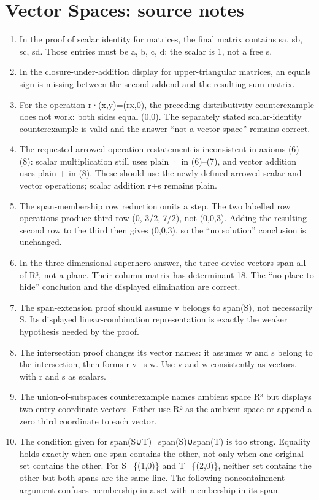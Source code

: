 \section*{Vector Spaces: source notes}
\begin{enumerate}
\item In the proof of scalar identity for matrices, the final matrix contains sa, sb, sc, sd. Those entries must be a, b, c, d: the scalar is 1, not a free s.
\item In the closure-under-addition display for upper-triangular matrices, an equals sign is missing between the second addend and the resulting sum matrix.
\item For the operation r·(x,y)=(rx,0), the preceding distributivity counterexample does not work: both sides equal (0,0). The separately stated scalar-identity counterexample is valid and the answer “not a vector space” remains correct.
\item The requested arrowed-operation restatement is inconsistent in axioms (6)–(8): scalar multiplication still uses plain · in (6)–(7), and vector addition uses plain + in (8). These should use the newly defined arrowed scalar and vector operations; scalar addition r+s remains plain.
\item The span-membership row reduction omits a step. The two labelled row operations produce third row (0, 3/2, 7/2), not (0,0,3). Adding the resulting second row to the third then gives (0,0,3), so the “no solution” conclusion is unchanged.
\item In the three-dimensional superhero answer, the three device vectors span all of R³, not a plane. Their column matrix has determinant 18. The “no place to hide” conclusion and the displayed elimination are correct.
\item The span-extension proof should assume v belongs to span(S), not necessarily S. Its displayed linear-combination representation is exactly the weaker hypothesis needed by the proof.
\item The intersection proof changes its vector names: it assumes w and s belong to the intersection, then forms r v+s w. Use v and w consistently as vectors, with r and s as scalars.
\item The union-of-subspaces counterexample names ambient space R³ but displays two-entry coordinate vectors. Either use R² as the ambient space or append a zero third coordinate to each vector.
\item The condition given for span(S∪T)=span(S)∪span(T) is too strong. Equality holds exactly when one span contains the other, not only when one original set contains the other. For S=\{(1,0)\} and T=\{(2,0)\}, neither set contains the other but both spans are the same line. The following noncontainment argument confuses membership in a set with membership in its span.
\end{enumerate}

